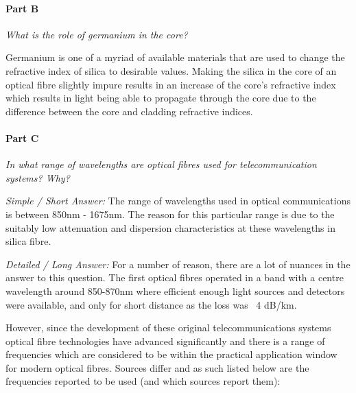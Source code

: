 \documentclass[colorlinks,11pt,a4paper,normalphoto,withhyper,ragged2e]{altareport}
\begin{document}
\paragraph{Part B \linebreak}
\textit{What is the role of germanium in the core?} \linebreak

Germanium is one of a myriad of available materials that are used to change the refractive index of silica to desirable values. Making the silica in the core of an optical fibre slightly impure results in an increase of the core's refractive index which results in light being able to propagate through the core due to the difference between the core and cladding refractive indices.




\paragraph{Part C \linebreak}
\textit{In what range of wavelengths are optical fibres used for telecommunication systems? Why?} \linebreak

\emph{Simple / Short Answer:} \linebreak
The range of wavelengths used in optical communications is between 850nm - 1675nm. The reason for this particular range is due to the suitably low attenuation and dispersion characteristics at these wavelengths in silica fibre. \linebreak

\emph{Detailed / Long Answer:} \linebreak
For a number of reason, there are a lot of nuances in the answer to this question. The first optical fibres operated in a band with a centre wavelength around 850-870nm \cite{fund_of_photonics}\cite{adv_fiber_optics} where efficient enough light sources and detectors were available, and only for short distance as the loss was ~4 dB/km. \cite{adv_fiber_optics} \linebreak

\newpage

However, since the development of these original telecommunications systems optical fibre technologies have advanced significantly and there is a range of frequencies which are considered to be within the practical application window for modern optical fibres. Sources differ and as such listed below are the frequencies reported to be used (and which sources report them):
\end{document}
